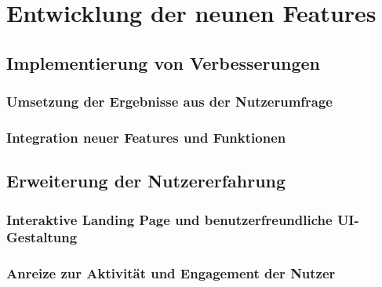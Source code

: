 
\chapter{Entwicklung der neunen Features}
\label{chapter:5}


\section{Implementierung von Verbesserungen }

\subsection{Umsetzung der Ergebnisse aus der Nutzerumfrage}

\subsection{Integration neuer Features und Funktionen}

\section{Erweiterung der Nutzererfahrung}

\subsection{Interaktive Landing Page und benutzerfreundliche UI-Gestaltung}

\subsection{Anreize zur Aktivität und Engagement der Nutzer}
